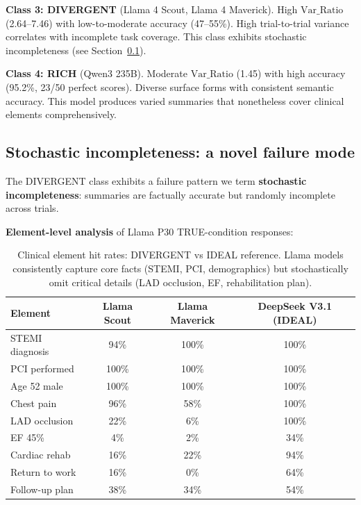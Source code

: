 \documentclass[11pt,a4paper]{article}
\begin{document}
\textbf{Class 3: DIVERGENT} (Llama 4 Scout, Llama 4 Maverick). High $\text{Var\_Ratio}$ (2.64--7.46) with low-to-moderate accuracy (47--55\%). High trial-to-trial variance correlates with incomplete task coverage. This class exhibits stochastic incompleteness (see Section~\ref{sec:stochastic}).

\textbf{Class 4: RICH} (Qwen3 235B). Moderate $\text{Var\_Ratio}$ (1.45) with high accuracy (95.2\%, 23/50 perfect scores). Diverse surface forms with consistent semantic accuracy. This model produces varied summaries that nonetheless cover clinical elements comprehensively.

\subsection{Stochastic incompleteness: a novel failure mode}
\label{sec:stochastic}

The DIVERGENT class exhibits a failure pattern we term \textbf{stochastic incompleteness}: summaries are factually accurate but randomly incomplete across trials.

\textbf{Element-level analysis} of Llama P30 TRUE-condition responses:

\begin{table}[H]
\centering
\begin{tabular}{lccc}
\toprule
\textbf{Element} & \textbf{Llama Scout} & \textbf{Llama Maverick} & \textbf{DeepSeek V3.1 (IDEAL)} \\
\midrule
STEMI diagnosis & 94\% & 100\% & 100\% \\
PCI performed & 100\% & 100\% & 100\% \\
Age 52 male & 100\% & 100\% & 100\% \\
Chest pain & 96\% & 58\% & 100\% \\
LAD occlusion & 22\% & 6\% & 100\% \\
EF 45\% & 4\% & 2\% & 34\% \\
Cardiac rehab & 16\% & 22\% & 94\% \\
Return to work & 16\% & 0\% & 64\% \\
Follow-up plan & 38\% & 34\% & 54\% \\
\bottomrule
\end{tabular}
\caption{Clinical element hit rates: DIVERGENT vs IDEAL reference. Llama models consistently capture core facts (STEMI, PCI, demographics) but stochastically omit critical details (LAD occlusion, EF, rehabilitation plan).}
\label{tab:elements}
\end{table}
\end{document}
